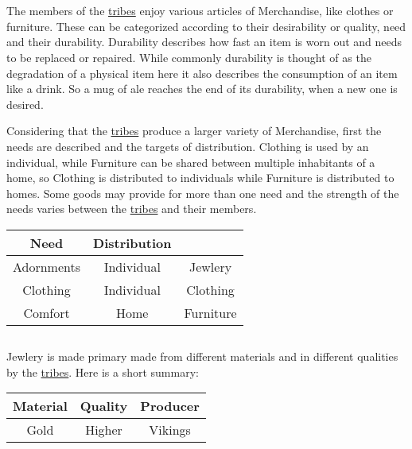 \section{}\label{ch:Goods:Merchandise}

The members of the \hyperref[ch:Tribes]{tribes} enjoy various articles of
\gls*{Merchandise}, like clothes or furniture. These can be categorized
according to their desirability or quality, need and their durability.
Durability describes how fast an item is worn out and needs to be replaced or
repaired. While commonly durability is thought of as the degradation of a
physical item here it also describes the consumption of an item like a drink.
So a mug of ale reaches the end of its durability, when a new one is desired.

Considering that the \hyperref[ch:Tribes]{tribes} produce a larger variety of
\gls*{Merchandise}, first the needs are described and the targets of
distribution. \Gls{Clothing} is used by an individual, while \gls{Furniture}
can be shared between multiple inhabitants of a home, so \Gls{Clothing} is
distributed to individuals while \gls{Furniture} is distributed to homes. Some
goods may provide for more than one need and the strength of the needs varies
between the \hyperref[ch:Tribes]{tribes} and their members.

\begin{longtable}{ccc}
	\toprule
	Need       & Distribution & \GLS{Merchandise} \\
	\midrule
	Adornments & Individual   & \Gls{Jewlery}     \\
	Clothing   & Individual   & \Gls{Clothing}    \\
	Comfort    & Home         & \Gls{Furniture}   \\
	\bottomrule
\end{longtable}

\subsection{}\label{ch:Goods:Merchandise:Jewlery}

\Gls{Jewlery} is made primary made from different materials and in different qualities by the
\hyperref[ch:Tribes]{tribes}. Here is a short summary:

\begin{longtable}{ccc}
	\toprule
	Material & Quality & Producer      \\
	\midrule
	Gold     & Higher  & \Gls{Vikings} \\
	\bottomrule
\end{longtable}


